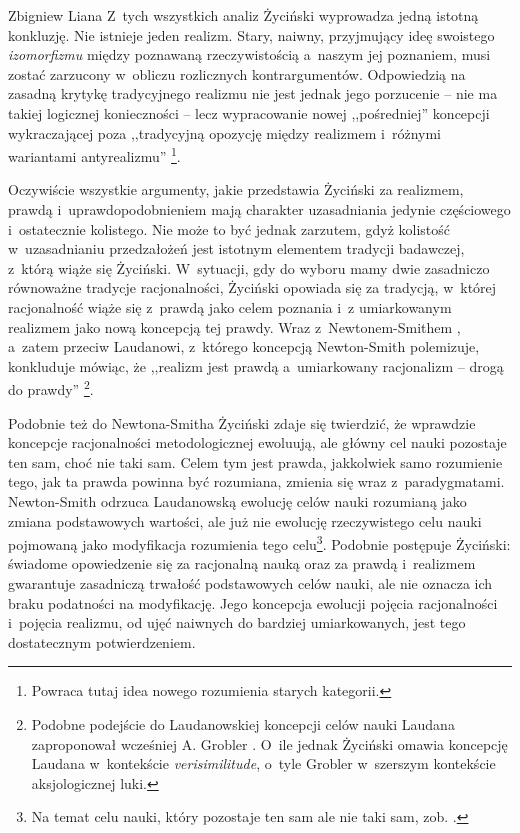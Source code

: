 \begin{artplenv}{Zbigniew Liana}
Z~tych wszystkich analiz Życiński wyprowadza jedną istotną konkluzję. Nie istnieje jeden realizm. Stary, naiwny, przyjmujący ideę swoistego \textit{izomorfizmu} między poznawaną rzeczywistością a~naszym jej poznaniem, musi zostać zarzucony w~obliczu rozlicznych kontrargumentów. Odpowiedzią na zasadną krytykę tradycyjnego realizmu nie jest jednak jego porzucenie -- nie ma takiej logicznej konieczności -- lecz wypracowanie nowej ,,pośredniej'' koncepcji wykraczającej poza ,,tradycyjną opozycję między realizmem i~różnymi wariantami antyrealizmu''
\parencite[][s.~184]{zycinski_teizm_1985}%
\footnote{Powraca tutaj idea nowego rozumienia starych kategorii.}.

Oczywiście wszystkie argumenty, jakie przedstawia Życiński za realizmem, prawdą i~uprawdopodobnieniem mają charakter uzasadniania jedynie częściowego i~ostatecznie kolistego. Nie może to być jednak zarzutem, gdyż kolistość w~uzasadnianiu przedzałożeń jest istotnym elementem tradycji badawczej, z~którą wiąże się Życiński. W~sytuacji, gdy do wyboru mamy dwie zasadniczo równoważne tradycje racjonalności, Życiński opowiada się za tradycją, w~której racjonalność wiąże się z~prawdą jako celem poznania i~z umiarkowanym realizmem jako nową koncepcją tej prawdy. Wraz z~Newtonem-Smithem
\parencite[][s.~273]{newton-smith_rationality_1981}, %
 a~zatem przeciw Laudanowi, z~którego koncepcją Newton-Smith polemizuje, konkluduje mówiąc, że ,,realizm jest prawdą a~umiarkowany racjonalizm -- drogą do prawdy'' 
\parencites[][s.~205]{zycinski_teizm_1985}[][s.~135]{zycinski_structure_1988}[][s.~239]{zycinski_struktura_2013_liana}%
\footnote{Podobne podejście do Laudanowskiej koncepcji celów nauki Laudana zaproponował wcześniej A. Grobler 
\parencite*[][s.~23.35--42]{grobler_prawda_1993}. %
 O~ile jednak Życiński omawia koncepcję Laudana w~kontekście \textit{verisimilitude}, o~tyle Grobler w~szerszym kontekście aksjologicznej luki.}.

Podobnie też do Newtona-Smitha Życiński zdaje się twierdzić, że wprawdzie koncepcje racjonalności metodologicznej ewoluują, ale główny cel nauki pozostaje ten sam, choć nie taki sam. Celem tym jest prawda, jakkolwiek samo rozumienie tego, jak ta prawda powinna być rozumiana, zmienia się wraz z~paradygmatami. Newton-Smith odrzuca Laudanowską ewolucję celów nauki rozumianą jako zmiana podstawowych wartości, ale już nie ewolucję rzeczywistego celu nauki pojmowaną jako modyfikacja rozumienia tego celu\footnote{Na temat celu nauki, który pozostaje ten sam ale nie taki sam, zob.
\parencite[][s.~221nn.269n]{newton-smith_rationality_1981}.%
}. Podobnie postępuje Życiński: świadome opowiedzenie się za racjonalną nauką oraz za prawdą i~realizmem gwarantuje zasadniczą trwałość podstawowych celów nauki, ale nie oznacza ich braku podatności na modyfikację. Jego koncepcja ewolucji pojęcia racjonalności i~pojęcia realizmu, od ujęć naiwnych do bardziej umiarkowanych, jest tego dostatecznym potwierdzeniem.


\end{artplenv}
